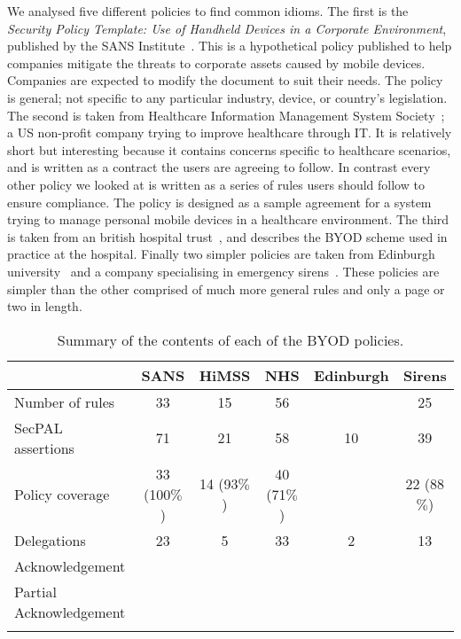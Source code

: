 \documentclass{article}
\begin{document}
We analysed five different policies to find common idioms.
The first is the \emph{Security Policy Template: Use of Handheld Devices in a Corporate Environment}, published by the SANS Institute~\cite{nicholas_r._c._guerin_security_2008}.
This is a hypothetical policy published to help companies mitigate the threats to corporate assets caused by mobile devices. 
Companies are expected to modify the document to suit their needs.  
The policy is general; not specific to any particular industry, device, or country's legislation.
The second is taken from Healthcare Information Management System Society~\cite{healthcare_information_and_management_systems_society_mobile_2012}; 
  a US non-profit company trying to improve healthcare through IT.  
It is relatively short but interesting because it contains concerns specific to healthcare scenarios, and is written as a contract the users are agreeing to follow. 
In contrast every other policy we looked at is written as a series of rules users should follow to ensure compliance.
The policy is designed as a sample agreement for a system trying to manage personal mobile devices in a healthcare environment.
The third is taken from an british hospital trust~\cite{kennington_mobiles_2014}, and describes the BYOD scheme used in practice at the hospital. 
Finally two simpler policies are taken from Edinburgh university~\cite{david_williamson_bring_2015} and a company specialising in emergency sirens~\cite{code3pse.org_sample_????}. 
These policies are simpler than the other comprised of much more general rules and only a page or two in length.

\begin{table}\centering\footnotesize\sffamily
  \begin{tabular}{l c c c c c}
    \toprule
                             & {SANS}       & {HiMSS}     & {NHS}       & {Edinburgh} & {Sirens}    \\
    \midrule
    Number of rules          & 33           & 15          & 56          &             & 25          \\
    SecPAL assertions        & 71           & 21          & 58          & 10          & 39          \\
    Policy coverage          & 33 (100$\%$) & 14 (93$\%$) & 40 (71$\%$) &             & 22 (88$\%$) \\
    \midrule
    Delegations              & 23           & 5           & 33          & 2           & 13          \\
    Acknowledgement          &              &             &             &             &             \\
    Partial Acknowledgement  &              &             &             &             &             \\
    \bottomrule             \\
  \end{tabular}
  \label{tab:summary}
  \caption{Summary of the contents of each of the BYOD policies.}
\end{table}
\end{document}
